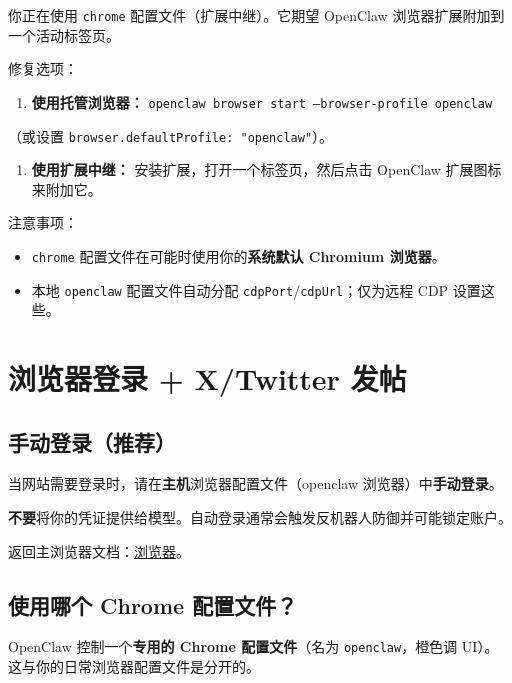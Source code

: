 你正在使用 \texttt{chrome} 配置文件（扩展中继）。它期望 OpenClaw 浏览器扩展附加到一个活动标签页。

修复选项：

\begin{enumerate}
  \item \textbf{使用托管浏览器：} \texttt{openclaw browser start --browser-profile openclaw}
\end{enumerate}

（或设置 \texttt{browser.defaultProfile: "openclaw"}）。
\begin{enumerate}
  \item \textbf{使用扩展中继：} 安装扩展，打开一个标签页，然后点击 OpenClaw 扩展图标来附加它。
\end{enumerate}


注意事项：

\begin{itemize}
  \item \texttt{chrome} 配置文件在可能时使用你的\textbf{系统默认 Chromium 浏览器}。
  \item 本地 \texttt{openclaw} 配置文件自动分配 \texttt{cdpPort}/\texttt{cdpUrl}；仅为远程 CDP 设置这些。
\end{itemize}



\clearpage

\section{浏览器登录 + X/Twitter 发帖}


\subsection{手动登录（推荐）}


当网站需要登录时，请在\textbf{主机}浏览器配置文件（openclaw 浏览器）中\textbf{手动登录}。

\textbf{不要}将你的凭证提供给模型。自动登录通常会触发反机器人防御并可能锁定账户。

返回主浏览器文档：\href{/tools/browser}{浏览器}。

\subsection{使用哪个 Chrome 配置文件？}


OpenClaw 控制一个\textbf{专用的 Chrome 配置文件}（名为 \texttt{openclaw}，橙色调 UI）。这与你的日常浏览器配置文件是分开的。

